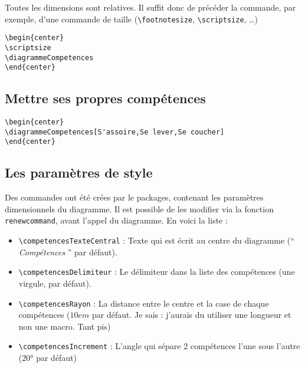 \documentclass[a4paper,12pt]{article}
\begin{document}
			Toutes les dimensions sont relatives.
			Il suffit donc de précéder la commande, par exemple, d'une commande de taille (\verb!\footnotesize!, \verb!\scriptsize!,  \dots)

			\begin{verbatim}
\begin{center}
\scriptsize
\diagrammeCompetences
\end{center}
			\end{verbatim}

		\begin{center}
			\scriptsize
			\diagrammeCompetences
		\end{center}



		\subsection{Mettre ses propres compétences}


			\begin{verbatim}
\begin{center}
\diagrammeCompetences[S'assoire,Se lever,Se coucher]
\end{center}
			\end{verbatim}

			\begin{center}
			\end{center}


		\subsection{Les paramètres de style}


			Des commandes ont été crées par le packages, contenant les paramètres dimensionnels du diagramme.
			Il est possible de les modifier via la fonction \verb!renewcommand!, avant l'appel du diagramme.
			En voici la liste :

			\begin{itemize}
				\item \verb!\competencesTexteCentral! : Texte qui est écrit au centre du diagramme (`` \emph{Compétences} '' par défaut).
				\item \verb!\competencesDelimiteur! : Le délimiteur dans la liste des compétences (une virgule, par défaut).
				\item \verb!\competencesRayon! : La distance entre le centre et la case de chaque compétences ($10em$ par défaut. Je sais : j'aurais du utiliser une longueur et non une macro. Tant pis)
				\item \verb!\competencesIncrement! : L'angle qui sépare 2 compétences l'une sous l'autre ($20°$ par défaut)
			\end{itemize}
\end{document}
